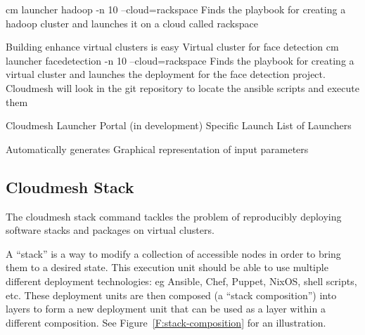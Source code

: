 cm launcher hadoop -n 10 --cloud=rackspace
Finds the playbook for creating a hadoop cluster and launches it on a cloud called rackspace



Building enhance virtual clusters is easy
Virtual cluster for face detection
cm launcher facedetection -n 10 --cloud=rackspace
Finds the playbook for creating a virtual cluster and launches the deployment for the face detection project.
Cloudmesh will look in the git repository to locate the ansible scripts and execute them


Cloudmesh Launcher Portal (in development)
       Specific Launch                                    List of Launchers





Automatically generates Graphical representation of input parameters                                  


\subsection{Cloudmesh Stack}
\label{S:stacks}

The cloudmesh stack command tackles the problem of reproducibly
deploying software stacks and packages on virtual clusters.

A ``stack'' is a way to modify a collection of accessible nodes in
order to bring them to a desired state. This execution unit should be
able to use multiple different deployment technologies: eg Ansible,
Chef, Puppet, NixOS, shell scripts, etc. These deployment units are
then composed (a ``stack composition'') into layers to form a new
deployment unit that can be used as a layer within a different
composition. See Figure~\ref{F:stack-composition} for an illustration.



